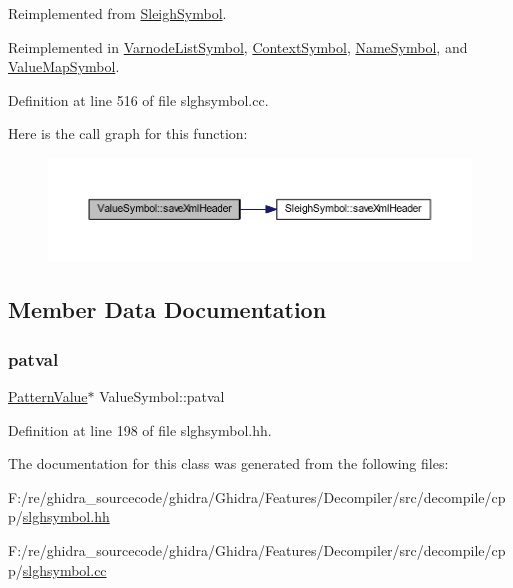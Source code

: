 Reimplemented from \mbox{\hyperlink{class_sleigh_symbol_ac501be7c584bc0568c29fb95910962e9}{Sleigh\+Symbol}}.



Reimplemented in \mbox{\hyperlink{class_varnode_list_symbol_ab94e4dd41289435b00157190e6ba6a71}{Varnode\+List\+Symbol}}, \mbox{\hyperlink{class_context_symbol_a4a9e76b855af1a02bc7ab142d041db87}{Context\+Symbol}}, \mbox{\hyperlink{class_name_symbol_a6579b3f6516743c8ba34aa2e86429a14}{Name\+Symbol}}, and \mbox{\hyperlink{class_value_map_symbol_a11fcdd4ed7bb9ede9c5bb407436b85bf}{Value\+Map\+Symbol}}.



Definition at line 516 of file slghsymbol.\+cc.

Here is the call graph for this function\+:
\nopagebreak
\begin{figure}[H]
\begin{center}
\leavevmode
\includegraphics[width=350pt]{class_value_symbol_a7b1c84bd9d7e84f9272d448d10c31200_cgraph}
\end{center}
\end{figure}


\subsection{Member Data Documentation}
\mbox{\label{class_value_symbol_a816cbca7518de0d1d23220ff443d8189}} 
\subsubsection{\texorpdfstring{patval}{patval}}
{\footnotesize\ttfamily \mbox{\hyperlink{class_pattern_value}{Pattern\+Value}}$\ast$ Value\+Symbol\+::patval\hspace{0.3cm}{\ttfamily [protected]}}



Definition at line 198 of file slghsymbol.\+hh.



The documentation for this class was generated from the following files\+:\begin{DoxyCompactItemize}
\item 
F\+:/re/ghidra\+\_\+sourcecode/ghidra/\+Ghidra/\+Features/\+Decompiler/src/decompile/cpp/\mbox{\hyperlink{slghsymbol_8hh}{slghsymbol.\+hh}}\item 
F\+:/re/ghidra\+\_\+sourcecode/ghidra/\+Ghidra/\+Features/\+Decompiler/src/decompile/cpp/\mbox{\hyperlink{slghsymbol_8cc}{slghsymbol.\+cc}}\end{DoxyCompactItemize}
